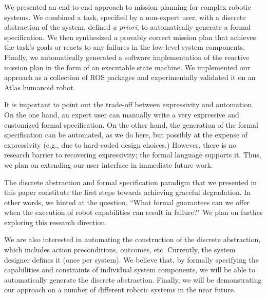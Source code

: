 
We presented an end-to-end approach to mission planning for complex robotic systems.
We combined a task, specified by a non-expert user, with a discrete abstraction of the system, defined \emph{a priori}, to automatically generate a formal specification.
We then synthesized a provably correct mission plan that achieves the task's goals or reacts to any failures in the low-level system components.
Finally, we automatically generated a software implementation of the reactive mission plan in the form of an executable state machine.
We implemented our approach as a collection of ROS packages and experimentally validated it on an Atlas humanoid robot.

It is important to point out the trade-off between expressivity and automation.
On the one hand, an expert user can manually write a very expressive and customized formal specification.
On the other hand, the generation of the formal specification can be automated, as we do here, but possibly at the expense of expressivity (e.g., due to hard-coded design choices.)
However, there is no research barrier to recovering expressivity; the formal language supports it.
Thus, we plan on extending our user interface in immediate future work.

The discrete abstraction and formal specification paradigm that we presented in this paper constitute the first steps towards achieving graceful degradation.
In other words, we hinted at the question, ``What formal guarantees can we offer when the execution of robot capabilities can result in failure?"
We plan on further exploring this research direction.

We are also interested in automating the construction of the discrete abstraction, which includes action preconditions, outcomes, etc.
Currently, the system designer defines it (once per system).
We believe that, by formally specifying the capabilities and constraints of individual system components, we will be able to automatically generate the discrete abstraction.
Finally, we will be demonstrating our approach on a number of different robotic systems in the near future.

